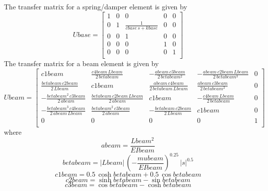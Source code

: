 \documentclass[12pt]{article}
\begin{document}
The transfer matrix for a spring/damper element is given by
\begin{equation}
Ubase= \left[ \begin{array}{ccccc}1&0&0&0&0\\ 0&1& \displaystyle \frac{1}{cbase\,s+kbase}&0&0\\ 0&0&1&0 &0\\ 0&0&0&1&0\\ 0&0&0&0&1\\ \end{array} \right] 
\end{equation}
The transfer matrix for a beam element is given by
\begin{equation}
Ubeam= \left[ \begin{array}{ccccc}c1beam& \displaystyle \frac{c4beam\,Lbeam}{2\,betabeam}&- \displaystyle \frac{abeam\, c3beam}{2\,betabeam^2}&- \displaystyle \frac{abeam\,c2beam\,Lbeam}{2\, betabeam^3}&0\\  \displaystyle \frac{betabeam\,c2beam}{2\,Lbeam}&c1beam& \displaystyle \frac{abeam \,c4beam}{2\,betabeam\,Lbeam}& \displaystyle \frac{abeam\,c3beam}{2\, betabeam^2}&0\\ - \displaystyle \frac{betabeam^2\,c3beam}{2\,abeam}& \displaystyle \frac{betabeam \,c2beam\,Lbeam}{2\,abeam}&c1beam&- \displaystyle \frac{c4beam\,Lbeam}{2\, betabeam}&0\\ - \displaystyle \frac{betabeam^3\,c4beam}{2\,abeam\,Lbeam}& \displaystyle \frac{ betabeam^2\,c3beam}{2\,abeam}&- \displaystyle \frac{betabeam\,c2beam}{2\, Lbeam}&c1beam&0\\ 0&0&0&0&1\\ \end{array} \right] 
\end{equation}
where
\begin{equation}
 abeam= \displaystyle \frac{Lbeam^2}{EIbeam} 
\end{equation}
\begin{equation}
 betabeam=\left| Lbeam\right| \,\left(- \displaystyle \frac{mubeam}{EIbeam} \right)^0.25\,\left| s\right| ^0.5 
\end{equation}
\begin{equation}
 c1beam=0.5\,\cosh betabeam+0.5\,\cos betabeam 
\end{equation}
\begin{equation}
 c2beam=\sinh betabeam-\sin betabeam 
\end{equation}
\begin{equation}
 c3beam=\cos betabeam-\cosh betabeam 
\end{equation}
\end{document}
